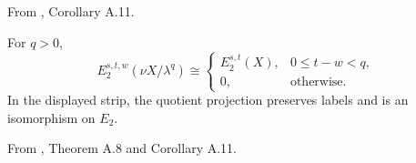 \begin{proposition}
\label{sem:Literature:finite-quotient-labels}
From \cite{BHS}, Corollary A.11.\par

For $q>0$,
\[E_2^{s,t,w}(\nu X/\lambda^q)\cong
\begin{cases}E_2^{s,t}(X),&0\le t-w<q,\\0,&\text{otherwise}.\end{cases}\]
In the displayed strip, the quotient projection preserves labels and is an isomorphism on $E_2$.

From \cite{BHS}, Theorem A.8 and Corollary A.11.\par


\end{proposition}
